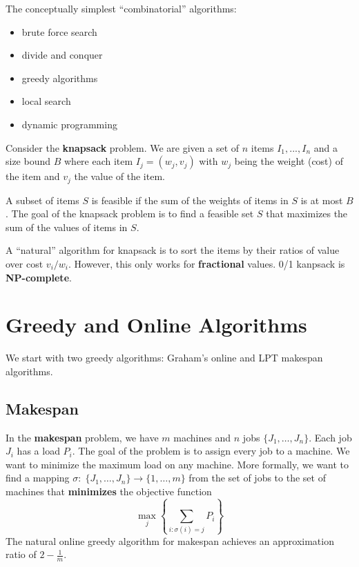 



The conceptually simplest ``combinatorial'' algorithms:
\begin{multicols}{3}
    \begin{itemize}
        \item brute force search
        \item divide and conquer
        \item greedy algorithms
        \item local search
        \item dynamic programming
    \end{itemize}
\end{multicols}

Consider the \textbf{knapsack} problem. We are given a set of $n$ items $I_1,...,I_n$ and a size bound $B$ where each item $I_j = (w_j , v_j)$ with $w_j$ being the weight (cost) of the item and $v_j$ the value of the item.

A subset of items $S$ is feasible if the sum of the weights of items in $S$ is at most $B$. The goal of the knapsack problem is to find a feasible set $S$ that maximizes the sum of the values of items in $S$.

A ``natural'' algorithm for knapsack is to sort the items by their ratios of value over cost $v_i/w_i$. However, this only works for \textbf{fractional} values. 0/1 kanpsack is \textbf{NP-complete}.

\section{Greedy and Online Algorithms}

We start with two greedy algorithms: Graham's online and LPT makespan algorithms.

\subsection{Makespan}

In the \textbf{makespan} problem, we have $m$ machines and $n$ jobs $\{J_1,\ldots,J_n\}$. Each job $J_i$ has a load $P_i$. The goal of the problem is to assign every job to a machine. We want to minimize the maximum load on any machine. More formally, we want to find a mapping $\sigma:\; \{J_1,\ldots,J_n\} \to \{1,\ldots,m\}$ from the set of jobs to the set of machines that \textbf{minimizes} the objective function
$$
\max_j \left\{ \sum_{i:\sigma(i)=j} P_i \right\}
$$
The natural online greedy algorithm for makespan achieves an approximation ratio of $2-\frac{1}{m}$.

